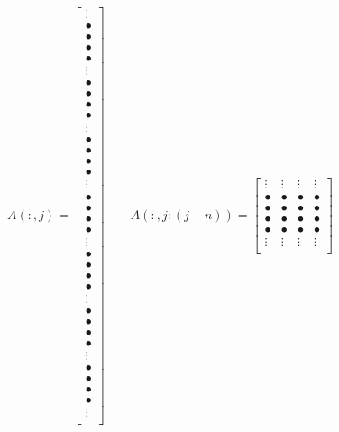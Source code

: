 \documentclass[12pt]{article}
\begin{document}
$$
A(:,j)=
\begin{bmatrix}
    \vdots \\
    \bullet\\
    \bullet\\
    \bullet\\
    \bullet\\
    \vdots \\
    \bullet\\
    \bullet\\
    \bullet\\
    \bullet\\
    \vdots \\
    \bullet\\
    \bullet\\
    \bullet\\
    \bullet\\
    \vdots \\
    \bullet\\
    \bullet\\
    \bullet\\
    \bullet\\
    \vdots \\
    \bullet\\
    \bullet\\
    \bullet\\
    \bullet\\
    \vdots \\
    \bullet\\
    \bullet\\
    \bullet\\
    \bullet\\
    \vdots \\
    \bullet\\
    \bullet\\
    \bullet\\
    \bullet\\
    \vdots \\
\end{bmatrix}
\qquad
A(:,j:(j+n))=
\begin{bmatrix}
    \vdots  & \vdots  & \vdots  & \vdots \\
    \bullet & \bullet & \bullet & \bullet \\
    \bullet & \bullet & \bullet & \bullet \\
    \bullet & \bullet & \bullet & \bullet \\
    \bullet & \bullet & \bullet & \bullet \\
    \vdots  & \vdots  & \vdots  & \vdots \\

\end{bmatrix}$$
\end{document}
